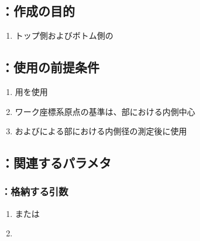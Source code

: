 \subsection{\KEndFaceRight：作成の目的}
\begin{enumerate}[label*=\sarrow]
\item トップ側およびボトム側の\EndFacecutMilling
\end{enumerate}


\subsection{\KEndFaceRight：使用の前提条件}
\begin{enumerate}[label*=\sarrow]
\item \EndFacecutMilling 用\FaceMill を使用
\item {}ワーク座標系原点の基準は、\EndFace 部における内側中心
\item \MXIWidth および\MYIWidth による\EndFace 部における内側径の測定後に使用
\end{enumerate}


\subsection{\KEndFaceRight：関連するパラメタ}

\subsubsection{\KEndFaceRight：格納する引数}
\begin{enumerate}[label*=\sarrow]
\item \PMTopReAlocationLength または\PMBottomReAlocationLength
\item \PMODCornerR
\end{enumerate}

